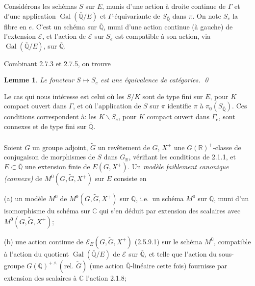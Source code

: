 \documentclass[12pt,a4paper]{article}
\theoremstyle{plain}
\newtheorem{lemma}[theorem]{Lemme}
\theoremstyle{definition}
\theoremstyle{remark}
\DeclareMathOperator{\Gal}{Gal}
\newcommand{\QQ}{\mathbb{Q}}
\newcommand{\RR}{\mathbb{R}}
\newcommand{\CC}{\mathbb{C}}
\begin{document}
\subsubsection{}

Consid\'erons les sch\'emas $S$ sur $E$, munis d'une action \`a droite continue de $\Gamma$ et d'une application $\Gal(\overline{\QQ}/E)$ et $\Gamma$-\'equivariante de $S_{\overline{\QQ}}$ dans $\pi$. On note $S_e$ la fibre en $e$. C'est un sch\'ema sur $\overline{\QQ}$, muni d'une action continue (\`a gauche) de l'extension $\mathscr{E}$, et l'action de $\mathscr{E}$ sur $S_e$ est compatible \`a son action, via $\Gal(\overline{\QQ}/E)$, sur $\overline{\QQ}$.

Combinant 2.7.3 et 2.7.5, on trouve

\begin{lemma}
Le foncteur $S \mapsto S_e$ est une \'equivalence de cat\'egories.
\qed
\end{lemma}

Le cas qui nous int\'eresse est celui o\`u les $S/K$ sont de type fini sur $E$, pour $K$ compact ouvert dans $\Gamma$, et o\`u l'application de $S$ sur $\pi$ identifie $\pi$ \`a $\pi_0(S_{\overline{\QQ}})$. Ces conditions correspondent \`a: les $K\backslash S_e$, pour $K$ compact ouvert dans $\Gamma_e$, sont connexes et de type fini sur $\overline{\QQ}$.

\subsubsection{}

Soient $G$ un groupe adjoint, $\tilde{G}$ un rev\^etement de $G$, $X^+$ une $G(\RR)^+$-classe de conjugaison de morphismes de $S$ dans $G_{\RR}$, v\'erifiant les conditions de 2.1.1, et $E \subset \overline{\QQ}$ une extension finie de $E(G,X^+)$. Un \textit{mod\`ele faiblement canonique (connexe)} de $M^0(G,\tilde{G},X^+)$ sur $E$ consiste en

(a) un mod\`ele $M^0$ de $M^0(G,\tilde{G},X^+)$ sur $\overline{\QQ}$, i.e.~un sch\'ema $M^0$ sur $\overline{\QQ}$, muni d'un isomorphisme du sch\'ema sur $\CC$ qui s'en d\'eduit par extension des scalaires avec $M^0(G,\tilde{G},X^+)$;

(b) une action continue de $\mathscr{E}_E(G,\tilde{G},X^+)$ (2.5.9.1) sur le sch\'ema $M^0$, compatible \`a l'action du quotient $\Gal(\overline{\QQ}/E)$ de $\mathscr{E}$ sur $\overline{\QQ}$, et telle que l'action du sous-groupe $G(\QQ)^{+\wedge}(\text{rel.~}\tilde{G})$ (une action $\overline{\QQ}$-lin\'eaire cette fois) fournisse par extension des scalaires \`a $\CC$ l'action 2.1.8;
\end{document}
